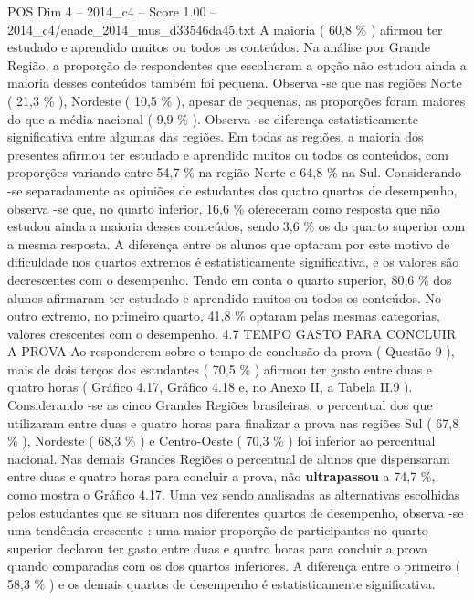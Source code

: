 \begin{textsample}{POS Dim 4 – 2014\_c4 – Score 1.00 – 2014\_c4/enade\_2014\_mus\_d33546da45.txt}
A maioria ( 60,8 \% ) afirmou ter estudado e aprendido muitos ou todos os conteúdos.
Na análise por Grande Região, a proporção de respondentes que escolheram a opção não estudou ainda a maioria desses conteúdos também foi pequena.
Observa -se que nas regiões Norte ( 21,3 \% ), Nordeste ( 10,5 \% ), apesar de pequenas, as proporções foram maiores do que a média nacional ( 9,9 \% ).
Observa -se diferença estatisticamente significativa entre algumas das regiões.
Em todas as regiões, a maioria dos presentes afirmou ter estudado e aprendido muitos ou todos os conteúdos, com proporções variando entre 54,7 \% na região Norte e 64,8 \% na Sul.
Considerando -se separadamente as opiniões de estudantes dos quatro quartos de desempenho, observa -se que, no quarto inferior, 16,6 \% ofereceram como resposta que não estudou ainda a maioria desses conteúdos, sendo 3,6 \% os do quarto superior com a mesma resposta.
A diferença entre os alunos que optaram por este motivo de dificuldade nos quartos extremos é estatisticamente significativa, e os valores são decrescentes com o desempenho.
Tendo em conta o quarto superior, 80,6 \% dos alunos afirmaram ter estudado e aprendido muitos ou todos os conteúdos.
No outro extremo, no primeiro quarto, 41,8 \% optaram pelas mesmas categorias, valores crescentes com o desempenho. 4.7 TEMPO GASTO PARA CONCLUIR A PROVA Ao responderem sobre o tempo de conclusão da prova ( Questão 9 ), mais de dois terços dos estudantes ( 70,5 \% ) afirmou ter gasto entre duas e quatro horas ( Gráfico 4.17, Gráfico 4.18 e, no Anexo II, a Tabela II.9 ).
Considerando -se as cinco Grandes Regiões brasileiras, o percentual dos que utilizaram entre duas e quatro horas para finalizar a prova nas regiões Sul ( 67,8 \% ), Nordeste ( 68,3 \% ) e Centro-Oeste ( 70,3 \% ) foi inferior ao percentual nacional.
Nas demais Grandes Regiões o percentual de alunos que dispensaram entre duas e quatro horas para concluir a prova, não \textbf{ultrapassou} a 74,7 \%, como mostra o Gráfico 4.17.
Uma vez sendo analisadas as alternativas escolhidas pelos estudantes que se situam nos diferentes quartos de desempenho, observa -se uma tendência crescente : uma maior proporção de participantes no quarto superior declarou ter gasto entre duas e quatro horas para concluir a prova quando comparadas com os dos quartos inferiores.
A diferença entre o primeiro ( 58,3 \% ) e os demais quartos de desempenho é estatisticamente significativa.

\end{textsample}
